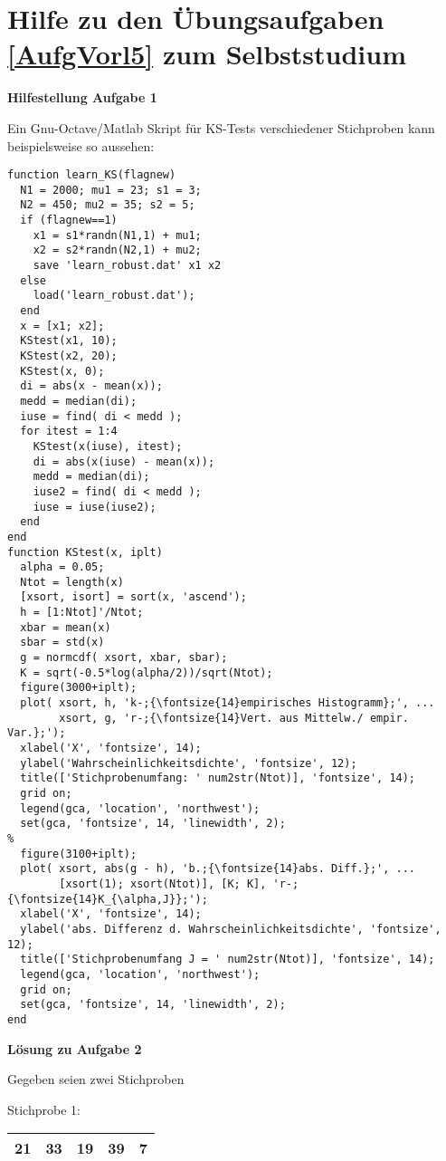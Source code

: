 \section{Hilfe zu den Übungsaufgaben \ref{AufgVorl5} zum Selbststudium}

\textbf{\large Hilfestellung Aufgabe 1}

Ein Gnu-Octave/Matlab Skript für KS-Tests verschiedener Stichproben
kann beispielsweise so aussehen:
\begin{verbatim}
function learn_KS(flagnew)
  N1 = 2000; mu1 = 23; s1 = 3;
  N2 = 450; mu2 = 35; s2 = 5;
  if (flagnew==1)
    x1 = s1*randn(N1,1) + mu1;
    x2 = s2*randn(N2,1) + mu2;
    save 'learn_robust.dat' x1 x2
  else
    load('learn_robust.dat');
  end
  x = [x1; x2];
  KStest(x1, 10);
  KStest(x2, 20);
  KStest(x, 0);
  di = abs(x - mean(x));
  medd = median(di);
  iuse = find( di < medd );
  for itest = 1:4
    KStest(x(iuse), itest);
    di = abs(x(iuse) - mean(x));
    medd = median(di);
    iuse2 = find( di < medd );
    iuse = iuse(iuse2);
  end
end
function KStest(x, iplt)
  alpha = 0.05;
  Ntot = length(x)
  [xsort, isort] = sort(x, 'ascend');
  h = [1:Ntot]'/Ntot;
  xbar = mean(x)
  sbar = std(x)
  g = normcdf( xsort, xbar, sbar);
  K = sqrt(-0.5*log(alpha/2))/sqrt(Ntot);
  figure(3000+iplt);
  plot( xsort, h, 'k-;{\fontsize{14}empirisches Histogramm};', ...
        xsort, g, 'r-;{\fontsize{14}Vert. aus Mittelw./ empir. Var.};');
  xlabel('X', 'fontsize', 14);
  ylabel('Wahrscheinlichkeitsdichte', 'fontsize', 12);
  title(['Stichprobenumfang: ' num2str(Ntot)], 'fontsize', 14);
  grid on;
  legend(gca, 'location', 'northwest');
  set(gca, 'fontsize', 14, 'linewidth', 2);
%
  figure(3100+iplt);
  plot( xsort, abs(g - h), 'b.;{\fontsize{14}abs. Diff.};', ...
        [xsort(1); xsort(Ntot)], [K; K], 'r-;{\fontsize{14}K_{\alpha,J}};');
  xlabel('X', 'fontsize', 14);
  ylabel('abs. Differenz d. Wahrscheinlichkeitsdichte', 'fontsize', 12);
  title(['Stichprobenumfang J = ' num2str(Ntot)], 'fontsize', 14);
  legend(gca, 'location', 'northwest');
  grid on;
  set(gca, 'fontsize', 14, 'linewidth', 2);
end
\end{verbatim}

\textbf{\large Lösung zu Aufgabe 2}

Gegeben seien zwei Stichproben

Stichprobe 1:

\begin{tabular}{|c|c|c|c|c|}
\hline
21 & 33 & 19 & 39 & 7\\
\hline
\end{tabular}

